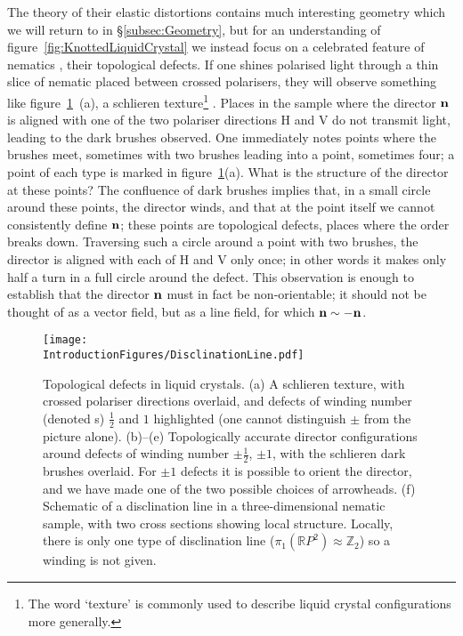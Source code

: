 The theory of their elastic distortions contains much interesting geometry which we will return to in \S \ref{subsec:Geometry}, but for an understanding of figure~\ref{fig:KnottedLiquidCrystal} we instead focus on a celebrated feature of nematics \citep{Frank1958}, their topological defects. If one shines polarised light through a thin slice of nematic placed between crossed polarisers, they will observe something like figure~\ref{fig:Disclination}~(a), a schlieren texture\footnote{The word `texture' is commonly used to describe liquid crystal configurations more generally.} \citep{deGennes1992}. Places in the sample where the director $\bf n$ is aligned with one of the two polariser directions H and V do not transmit light, leading to the dark brushes observed. One immediately notes points where the brushes meet, sometimes with two brushes leading into a point, sometimes four; a point of each type is marked in figure~\ref{fig:Disclination}(a). What is the structure of the director at these points? The confluence of dark brushes implies that, in a small circle around these points, the director winds, and that at the point itself we cannot consistently define $\bf n$; these points are topological defects, places where the order breaks down. Traversing such a circle around a point with two brushes, the director is aligned with each of H and V only once; in other words it makes only half a turn in a full circle around the defect. This observation is enough to establish that the director $\bf{n}$ must in fact be non-orientable; it should not be thought of as a vector field, but as a line field, for which $\bf n \sim - \bf n$.
\begin{figure}[htbp]
\centering
\texttt{[image: \\IntroductionFigures/DisclinationLine.pdf]}
\caption{Topological defects in liquid crystals. (a) A schlieren texture, with crossed polariser directions overlaid, and defects of winding number (denoted s) $\frac{1}{2}$ and $1$ highlighted (one cannot distinguish $\pm$ from the picture alone). (b)--(e) Topologically accurate director configurations around defects of winding number $\pm \frac{1}{2}$, $\pm1$, with the schlieren dark brushes overlaid. For $\pm1$ defects it is possible to orient the director, and we have made one of the two possible choices of arrowheads. (f) Schematic of a disclination line in a three-dimensional nematic sample, with two cross sections showing local structure. Locally, there is only one type of disclination line ($\pi_1(\mathbb{R}P^2) \approx \mathbb{Z}_2$) so a winding is not given.}
\label{fig:Disclination}
\end{figure}
